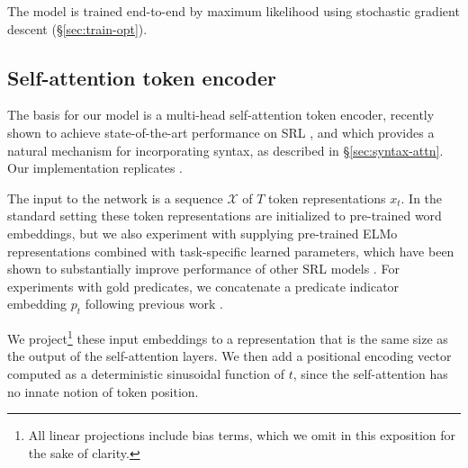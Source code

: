 \documentclass[11pt,a4paper]{article}
\begin{document}
The model is trained end-to-end by maximum likelihood using stochastic gradient descent (\S\ref{sec:train-opt}). 

\subsection{Self-attention token encoder \label{sec:self-attn}}
The basis for our model is a multi-head self-attention token encoder, recently shown to achieve state-of-the-art performance on SRL \citep{tan2018deep}, and which provides a natural mechanism for incorporating syntax, as described in \S\ref{sec:syntax-attn}. Our implementation replicates \citet{vaswani2017attention}. 

The input to the network is a sequence $\mathcal{X}$ of $T$ token representations $x_t$. In the standard setting these token representations are initialized to pre-trained word embeddings, but we also experiment with supplying pre-trained ELMo representations combined with task-specific learned parameters, which have been shown to substantially improve performance of other SRL models \citep{peters2018deep}.
For experiments with gold predicates, we concatenate a predicate indicator embedding $p_t$ following previous work \citep{he2017deep}.

We project\footnote{All linear projections include bias terms, which we omit in this exposition for the sake of clarity.} these input embeddings to a representation that is the same size as the output of the self-attention layers. We then add a positional encoding vector computed as a deterministic sinusoidal function of $t$, since the self-attention has no innate notion of token position. 
\end{document}
